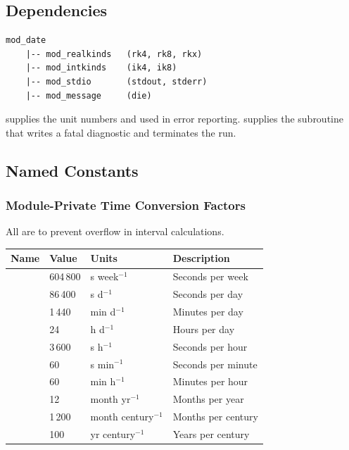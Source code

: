 \subsection{Dependencies}

\begin{lstlisting}
mod_date
    |-- mod_realkinds   (rk4, rk8, rkx)
    |-- mod_intkinds    (ik4, ik8)
    |-- mod_stdio       (stdout, stderr)
    |-- mod_message     (die)
\end{lstlisting}

 supplies the unit numbers  and 
used in error reporting.  supplies the  subroutine
that writes a fatal diagnostic and terminates the run.

\subsection{Named Constants}
\label{subsec:date_constants}

\subsubsection{Module-Private Time Conversion Factors}

All are  to prevent overflow in interval calculations.

\begin{longtable}{L{3cm} L{3cm} L{3cm} L{5cm}}
  \toprule
  \textbf{Name} & \textbf{Value} & \textbf{Units} & \textbf{Description} \\
  \midrule
  \endhead
  \bottomrule
  \endfoot
   & 604\,800  & s week$^{-1}$ & Seconds per week \\
   & 86\,400   & s d$^{-1}$    & Seconds per day \\
   & 1\,440    & min d$^{-1}$  & Minutes per day \\
   & 24        & h d$^{-1}$    & Hours per day \\
   & 3\,600    & s h$^{-1}$    & Seconds per hour \\
   & 60        & s min$^{-1}$  & Seconds per minute \\
   & 60        & min h$^{-1}$  & Minutes per hour \\
   & 12        & month yr$^{-1}$& Months per year \\
   & 1\,200    & month century$^{-1}$ & Months per century \\
   & 100       & yr century$^{-1}$ & Years per century \\
\end{longtable}

